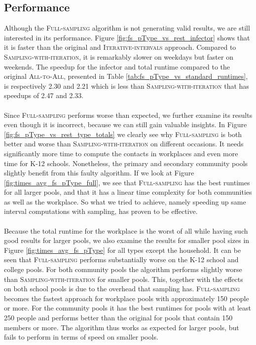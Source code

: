 \subsection{Performance}
\label{subsec:performance_full_sampling}
Although the \textsc{Full-sampling} algorithm is not generating valid results, we are still interested in its performance. Figure \ref{fig:fs_pType_vs_rest_infector} shows that it is faster than the original and \textsc{Iterative-intervals} approach. Compared to \textsc{Sampling-with-iteration}, it is remarkably slower on weekdays but faster on weekends. The speedup for the infector and total runtime compared to the original \textsc{All-to-All}, presented in Table \ref{tab:fs_pType_vs_standard_runtimes}, is respectively 2.30 and 2.21 which is less than \textsc{Sampling-with-iteration} that has speedups of 2.47 and 2.33.
\\\\
Since \textsc{Full-sampling} performs worse than expected, we further examine its results even though it is incorrect, because we can still gain valuable insights. In Figure \ref{fig:fs_pType_vs_rest_type_totals} we clearly see why \textsc{Full-sampling} is both better and worse than \textsc{Sampling-with-iteration} on different occasions. It needs significantly more time to compute the contacts in workplaces and even more time for K-12 schools. Nonetheless, the primary and secondary community pools slightly benefit from this faulty algorithm. If we look at Figure \ref{fig:times_avg_fs_pType_full}, we see that \textsc{Full-sampling} has the best runtimes for all larger pools, and that it has a linear time complexity for both communities as well as the workplace. So what we tried to achieve, namely speeding up same interval computations with sampling, has proven to be effective.
\\\\
Because the total runtime for the workplace is the worst of all while having such good results for larger pools, we also examine the results for smaller pool sizes in Figure \ref{fig:times_avg_fs_pType} for all types except the household. It can be seen that \textsc{Full-sampling} performs substantially worse on the K-12 school and college pools. For both community pools the algorithm performs slightly worse than \textsc{Sampling-with-iteration} for smaller pools. This, together with the effects on both school pools is due to the overhead that sampling has. \textsc{Full-sampling} becomes the fastest approach for workplace pools with approximately 150 people or more. For the community pools it has the best runtimes for pools with at least 250 people and performs better than the original for pools that contain 150 members or more. The algorithm thus works as expected for larger pools, but fails to perform in terms of speed on smaller pools.

